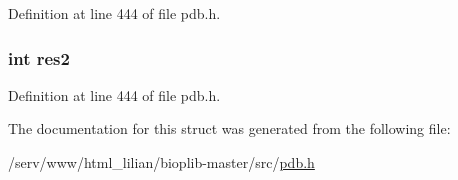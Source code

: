 Definition at line 444 of file pdb.\-h.

\hypertarget{struct__disulphide_ab2a9ff6fb3a64621cb23e1eb1290e043}{
\subsubsection[{res2}]{\setlength{\rightskip}{0pt plus 5cm}int res2}}\label{struct__disulphide_ab2a9ff6fb3a64621cb23e1eb1290e043}


Definition at line 444 of file pdb.\-h.



The documentation for this struct was generated from the following file\-:\begin{DoxyCompactItemize}
\item 
/serv/www/html\-\_\-lilian/bioplib-\/master/src/\hyperlink{pdb_8h}{pdb.\-h}\end{DoxyCompactItemize}

